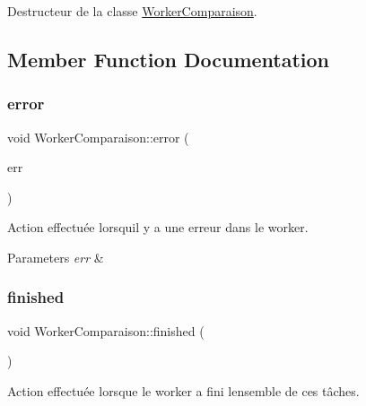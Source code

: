 Destructeur de la classe \hyperlink{classWorkerComparaison}{Worker\+Comparaison}. 



\subsection{Member Function Documentation}
\mbox{\label{classWorkerComparaison_aa9c167d230b850568f48575bc19241d7}} 
\subsubsection{\texorpdfstring{error}{error}}
{\footnotesize\ttfamily void Worker\+Comparaison\+::error (\begin{DoxyParamCaption}\item[{Q\+String}]{err }\end{DoxyParamCaption})\hspace{0.3cm}{\ttfamily [signal]}}



Action effectuée lorsqu\textquotesingle{}il y a une erreur dans le worker. 


\begin{DoxyParams}{Parameters}
{\em err} & \\
\hline
\end{DoxyParams}
\mbox{\label{classWorkerComparaison_a22ed9afba5f29d89a014b2b895d995b2}} 
\subsubsection{\texorpdfstring{finished}{finished}}
{\footnotesize\ttfamily void Worker\+Comparaison\+::finished (\begin{DoxyParamCaption}{ }\end{DoxyParamCaption})\hspace{0.3cm}{\ttfamily [signal]}}



Action effectuée lorsque le worker a fini l\textquotesingle{}ensemble de ces tâches. 

